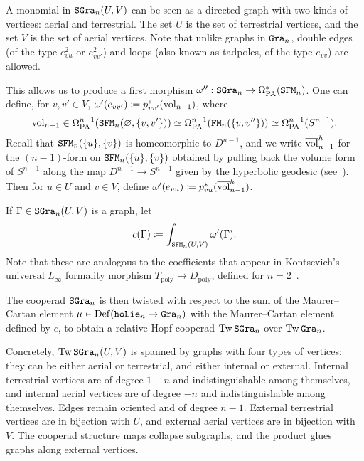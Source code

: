 A monomial in $\mathtt{SGra}_{n}(U,V)$ can be seen as a directed graph with two kinds of vertices: aerial and terrestrial.
The set $U$ is the set of terrestrial vertices, and the set $V$ is the set of aerial vertices.
Note that unlike graphs in $\mathtt{Gra}_{n}$, double edges (of the type $e_{vu}^{2}$ or $e_{vv'}^{2}$) and loops (also known as tadpoles, of the type $e_{vv}$) are allowed.

This allows us to produce a first morphism $\omega'' : \mathtt{SGra}_{n} \to \Omega_{\mathrm{PA}}^{*}(\mathtt{SFM}_{n})$.
One can define, for $v, v' \in V$, $\omega'(e_{vv'}) \coloneqq p_{vv'}^{*}(\mathrm{vol}_{n-1})$, where
\[ \mathrm{vol}_{n-1} \in \Omega_{\mathrm{PA}}^{n-1}(\mathtt{SFM}_{n}(\varnothing, \{v,v'\})) \simeq \Omega_{\mathrm{PA}}^{n-1}(\mathtt{FM}_{n}(\{v,v''\})) \simeq \Omega_{\mathrm{PA}}^{n-1}(S^{n-1}). \]
Recall that $\mathtt{SFM}_{n}(\{u\}, \{v\})$ is homeomorphic to $D^{n-1}$, and we write $\overline{\mathrm{vol}}^{h}_{n-1}$ for the $(n-1)$-form on $\mathtt{SFM}_{n}(\{u\}, \{v\})$ obtained by pulling back the volume form of $S^{n-1}$ along the map $D^{n-1} \to S^{n-1}$ given by the hyperbolic geodesic (see~\cite[Equation~(8)]{Willwacher2015a}).
Then for $u \in U$ and $v \in V$, define $\omega'(e_{vu}) \coloneqq p_{vu}^{*}(\overline{\mathrm{vol}}^{h}_{n-1})$.

If $\Gamma \in \mathtt{SGra}_{n}(U,V)$ is a graph, let
\begin{equation}
  \label{cnfbnd.eq.konts-coeff}
  c(\Gamma) \coloneqq \int_{\mathtt{SFM}_{n}(U,V)} \omega'(\Gamma).
\end{equation}
Note that these are analogous to the coefficients that appear in Kontsevich's universal $L_{\infty}$ formality morphism $T_{\mathrm{poly}} \to D_{\mathrm{poly}}$, defined for $n = 2$~\cite{Kontsevich2003}.

The cooperad $\mathtt{SGra}_{n}$ is then twisted with respect to the sum of the Maurer--Cartan element $\mu \in \operatorname{Def}(\mathtt{hoLie}_{n} \to \mathtt{Gra}_{n})$ with the Maurer--Cartan element defined by $c$, to obtain a relative Hopf cooperad $\operatorname{Tw} \mathtt{SGra}_{n}$ over $\operatorname{Tw} \mathtt{Gra}_{n}$.

Concretely, $\operatorname{Tw} \mathtt{SGra}_{n}(U,V)$ is spanned by graphs with four types of vertices: they can be either aerial or terrestrial, and either internal or external.
Internal terrestrial vertices are of degree $1-n$ and indistinguishable among themselves, and internal aerial vertices are of degree $-n$ and indistinguishable among themselves.
Edges remain oriented and of degree $n-1$.
External terrestrial vertices are in bijection with $U$, and external aerial vertices are in bijection with $V$.
The cooperad structure maps collapse subgraphs, and the product glues graphs along external vertices.

